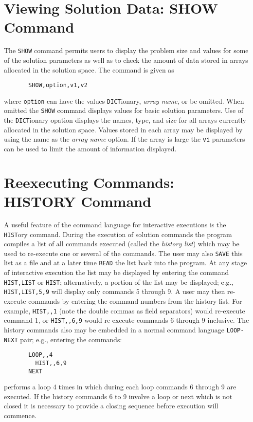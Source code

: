 \section{Viewing Solution Data: SHOW Command}
\label{show}

The {\tt SHOW} command permits users to display the problem size and values
for some of the solution parameters as well as to check the amount of data
stored in arrays allocated in the solution space.  The command is given as
\begin{verbatim}
       SHOW,option,v1,v2
\end{verbatim}
where {\tt option} can have the values {\tt DICT}ionary, {\it array name}, or 
be omitted.  When omitted the {\tt SHOW} command displays values for basic
solution parameters.  Use of the {\tt DICT}\-ion\-ary opation displays the
names, type, and size for all arrays currently allocated in the solution
space.  Values stored in each array may be displayed by using the name
as the {\it array name} option.  If the array is large the {\tt vi} parameters
can be used to limit the amount of information displayed.

\section{Reexecuting Commands: HISTORY Command}
\label{hist}

A useful feature of the command language for 
interactive executions is the {\tt HIST}ory command.  During the execution
of solution commands the program compiles a list of all commands 
executed (called the {\it history list}) which may be used to re-execute
one or several of the commands.  The user may also {\tt SAVE} this list
as a file and at a later time {\tt READ} the list back into the program.
At any stage of interactive execution the list may be displayed by
entering the command {\tt HIST,LIST} or {\tt HIST};
alternatively, a portion of the list
may be displayed; e.g., {\tt HIST,LIST,5,9} will display only commands
5 through 9.  A user may then re-execute commands by entering
the command numbers from the history list.  For example, {\tt HIST,,1}
(note the double commas as field separators) would re-execute
command 1, or {\tt HIST,,6,9} would re-execute commands 6 through 9
inclusive.  The history commands also may be embedded in a normal
command language {\tt LOOP-NEXT} pair;  e.g., entering the commands:
\begin{verbatim}
       LOOP,,4
         HIST,,6,9
       NEXT
\end{verbatim}
performs a loop 4 times in which during each loop commands
6 through 9 are executed.
If the history commands 6 to 9 involve a loop or next which is not
closed it is necessary to provide a closing sequence before execution
will commence.

